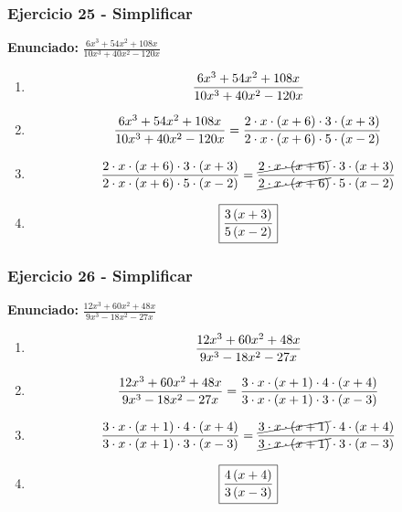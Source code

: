 \documentclass[11pt,a4paper]{article}
\newcommand{\fitmath}[1]{%
\[
\setbox0=\hbox{$\displaystyle #1$}%
\ifdim\wd0>\linewidth
\resizebox{\linewidth}{!}{$\displaystyle #1$}%
\else
#1%
\fi
\]
}
\begin{document}
\vspace{0.12cm}
\subsubsection*{Ejercicio 25 - Simplificar}
\textbf{Enunciado:} $ \frac{6 x^{3} + 54 x^{2} + 108 x}{10 x^{3} + 40 x^{2} - 120 x} $\par
\begin{enumerate}[leftmargin=2em]
\item \fitmath{\frac{6 x^{3} + 54 x^{2} + 108 x}{10 x^{3} + 40 x^{2} - 120 x}}
\item \fitmath{\frac{6 x^{3} + 54 x^{2} + 108 x}{10 x^{3} + 40 x^{2} - 120 x}=\frac{2\cdot x\cdot \left(x + 6\right)\cdot 3\cdot \left(x + 3\right)}{2\cdot x\cdot \left(x + 6\right)\cdot 5\cdot \left(x - 2\right)}}
\item \fitmath{\frac{2\cdot x\cdot \left(x + 6\right)\cdot 3\cdot \left(x + 3\right)}{2\cdot x\cdot \left(x + 6\right)\cdot 5\cdot \left(x - 2\right)}=\frac{\cancel{2\cdot x\cdot \left(x + 6\right)}\cdot 3\cdot \left(x + 3\right)}{\cancel{2\cdot x\cdot \left(x + 6\right)}\cdot 5\cdot \left(x - 2\right)}}
\item \fitmath{\boxed{\frac{3 \left(x + 3\right)}{5 \left(x - 2\right)}}}
\end{enumerate}

\vspace{0.12cm}
\subsubsection*{Ejercicio 26 - Simplificar}
\textbf{Enunciado:} $ \frac{12 x^{3} + 60 x^{2} + 48 x}{9 x^{3} - 18 x^{2} - 27 x} $\par
\begin{enumerate}[leftmargin=2em]
\item \fitmath{\frac{12 x^{3} + 60 x^{2} + 48 x}{9 x^{3} - 18 x^{2} - 27 x}}
\item \fitmath{\frac{12 x^{3} + 60 x^{2} + 48 x}{9 x^{3} - 18 x^{2} - 27 x}=\frac{3\cdot x\cdot \left(x + 1\right)\cdot 4\cdot \left(x + 4\right)}{3\cdot x\cdot \left(x + 1\right)\cdot 3\cdot \left(x - 3\right)}}
\item \fitmath{\frac{3\cdot x\cdot \left(x + 1\right)\cdot 4\cdot \left(x + 4\right)}{3\cdot x\cdot \left(x + 1\right)\cdot 3\cdot \left(x - 3\right)}=\frac{\cancel{3\cdot x\cdot \left(x + 1\right)}\cdot 4\cdot \left(x + 4\right)}{\cancel{3\cdot x\cdot \left(x + 1\right)}\cdot 3\cdot \left(x - 3\right)}}
\item \fitmath{\boxed{\frac{4 \left(x + 4\right)}{3 \left(x - 3\right)}}}
\end{enumerate}
\end{document}
